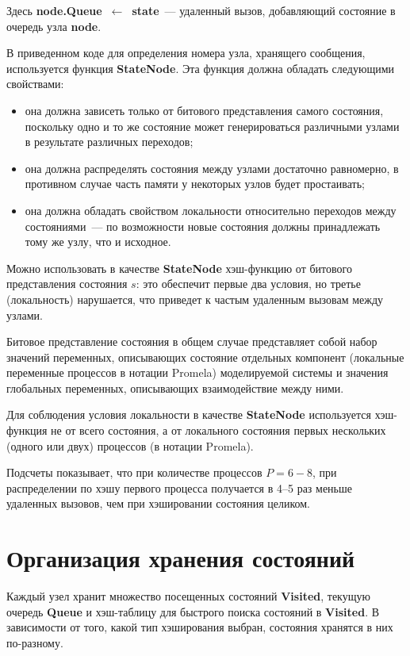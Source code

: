 \documentclass[12pt,a4paper,fleqn]{article}
\newcommand{\Code}[1]{\textbf{\mbox{#1}}}
\begin{document}
Здесь \Code{node.Queue $\leftarrow$ state}~--- удаленный вызов, добавляющий состояние в очередь узла
\Code{node}.

В приведенном коде для определения номера узла, хранящего сообщения, используется функция
\Code{StateNode}. Эта функция должна обладать следующими свойствами:

\begin{itemize}
\item она должна зависеть только от битового представления самого состояния, поскольку одно и то же состояние
  может генерироваться различными узлами в результате различных переходов;

\item она должна распределять состояния между узлами достаточно равномерно, в противном случае часть памяти у некоторых
  узлов будет простаивать;

\item она должна обладать свойством локальности относительно переходов между состояниями~--- по возможности новые
  состояния должны принадлежать тому же узлу, что и исходное.
\end{itemize}

Можно использовать в качестве \Code{StateNode} хэш-функцию от битового представления
состояния $s$: это обеспечит первые два условия, но третье (локальность) нарушается, что
приведет к частым удаленным вызовам между узлами.

Битовое представление состояния в общем случае представляет собой набор значений
переменных, описывающих состояние отдельных компонент (локальные переменные процессов в
нотации Promela) моделируемой системы и значения глобальных переменных, описывающих
взаимодействие между ними.

Для соблюдения условия локальности в качестве \Code{StateNode} используется хэш-функция не
от всего состояния, а от локального состояния первых нескольких (одного или двух)
процессов (в нотации Promela).

Подсчеты показывает, что при количестве процессов $P = 6-8$, при распределении по хэшу
первого процесса получается в 4--5 раз меньше удаленных вызовов, чем при хэшировании
состояния целиком.

\section{Организация хранения состояний}

Каждый узел хранит множество посещенных состояний \Code{Visited}, текущую очередь \Code{Queue} и
хэш-таблицу для быстрого поиска состояний в \Code{Visited}. В зависимости от того, какой тип
хэширования выбран, состояния хранятся в них по-разному.
\end{document}
